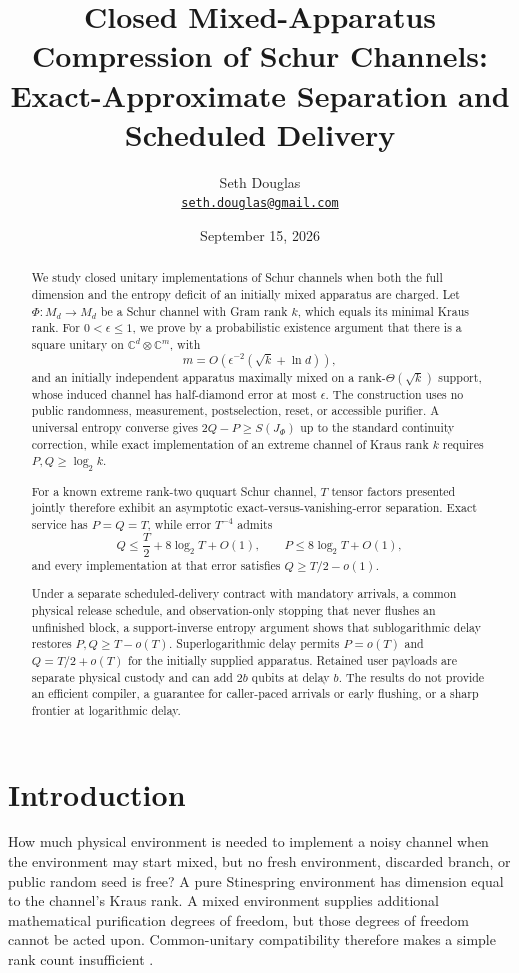 \documentclass[11pt,a4paper]{article}
\title{Closed Mixed-Apparatus Compression of Schur Channels:
Exact-Approximate Separation and Scheduled Delivery}
\author{Seth Douglas\\\href{mailto:seth.douglas@gmail.com}{\texttt{seth.douglas@gmail.com}}}
\date{September 15, 2026}
\numberwithin{equation}{section}
\begin{document}
\maketitle
\begin{abstract}
We study closed unitary implementations of Schur channels when both the
full dimension and the entropy deficit of an initially mixed apparatus
are charged. Let \(\Phi:M_d\to M_d\) be a Schur channel with Gram rank
\(k\), which equals its minimal Kraus rank. For \(0<\epsilon\le1\), we
prove by a probabilistic existence argument that there is a square
unitary on \(\mathbb C^d\otimes\mathbb C^m\), with \[
m=O\!\left(\epsilon^{-2}(\sqrt{k}+\ln d)\right),
\] and an initially independent apparatus maximally mixed on a
rank-\(\Theta(\sqrt{k})\) support, whose induced channel has
half-diamond error at most \(\epsilon\). The construction uses no public
randomness, measurement, postselection, reset, or accessible purifier. A
universal entropy converse gives \(2Q-P\ge S(J_\Phi)\) up to the
standard continuity correction, while exact implementation of an extreme
channel of Kraus rank \(k\) requires \(P,Q\ge\log_2k\).

For a known extreme rank-two ququart Schur channel, \(T\) tensor factors
presented jointly therefore exhibit an asymptotic
exact-versus-vanishing-error separation. Exact service has \(P=Q=T\),
while error \(T^{-4}\) admits \[
Q\le \frac T2+8\log_2T+O(1),\qquad
P\le8\log_2T+O(1),
\] and every implementation at that error satisfies \(Q\ge T/2-o(1)\).

Under a separate scheduled-delivery contract with mandatory arrivals, a
common physical release schedule, and observation-only stopping that
never flushes an unfinished block, a support-inverse entropy argument
shows that sublogarithmic delay restores \(P,Q\ge T-o(T)\).
Superlogarithmic delay permits \(P=o(T)\) and \(Q=T/2+o(T)\) for the
initially supplied apparatus. Retained user payloads are separate
physical custody and can add \(2b\) qubits at delay \(b\). The results
do not provide an efficient compiler, a guarantee for caller-paced
arrivals or early flushing, or a sharp frontier at logarithmic delay.
\end{abstract}
\section*{Introduction}\label{introduction}

How much physical environment is needed to implement a noisy channel
when the environment may start mixed, but no fresh environment,
discarded branch, or public random seed is free? A pure Stinespring
environment has dimension equal to the channel's Kraus rank. A mixed
environment supplies additional mathematical purification degrees of
freedom, but those degrees of freedom cannot be acted upon.
Common-unitary compatibility therefore makes a simple rank count
insufficient \citep{terhal1999, zalka2002}.
\end{document}
